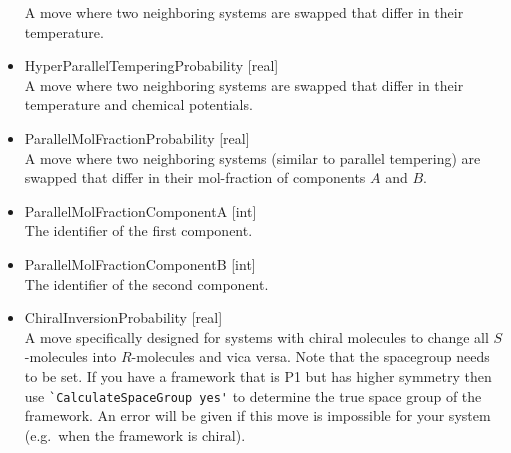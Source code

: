 \begin{itemize}
A move where two neighboring systems 
are swapped that differ in their temperature.
\item{HyperParallelTemperingProbability [real]}\\
A move where two neighboring systems 
are swapped that differ in their temperature
and chemical potentials.
\item{ParallelMolFractionProbability [real]}\\
A move where two neighboring systems (similar to parallel tempering)
are swapped that differ in their mol-fraction of components $A$ and $B$.
\item{ParallelMolFractionComponentA [int]}\\
The identifier of the first component.
\item{ParallelMolFractionComponentB [int]}\\
The identifier of the second component.
\item{ChiralInversionProbability [real]}\\
A move specifically designed for systems with chiral molecules
to change all $S$-molecules into $R$-molecules and vica versa.
Note that the spacegroup needs to be set. If you have a framework that is P1 but has higher symmetry then use \verb=`CalculateSpaceGroup yes'= to
determine the true space group of the framework. An error will be given if this move is impossible for your system (e.g.\ when the framework is chiral).
\end{itemize}

